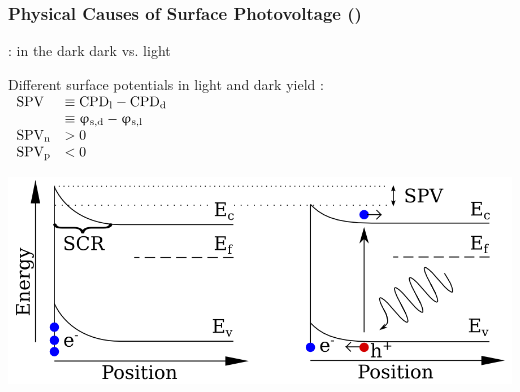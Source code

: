\documentclass{beamer}
\begin{document}
\begin{frame}
\frametitle{Physical Causes of Surface Photovoltage (\spv{})}
\begin{block}{\spv{}: \cpd{} in the dark dark vs. light}
\centering
\begin{minipage}{0.38\linewidth}
\centering
Different surface potentials in light and dark yield \spv{}:\\[12pt]
$\begin{array}{l l}
\text{SPV} &\equiv \text{CPD}_{\text{l}} - \text{CPD}_{\text{d}}\\
			&\equiv \upvarphi _{\text{s,d}} - \upvarphi _{\text{s,l}}\\
\text{SPV}_{\text{n}} 	&> 0	 \\
\text{SPV}_{\text{p}} 	&< 0			\end{array}$
\end{minipage}
\begin{minipage}{0.6\linewidth}
\includegraphics[width=1\linewidth]{./figs/pres/spvdef}
\end{minipage}
\end{block}\end{frame}
\end{document}
